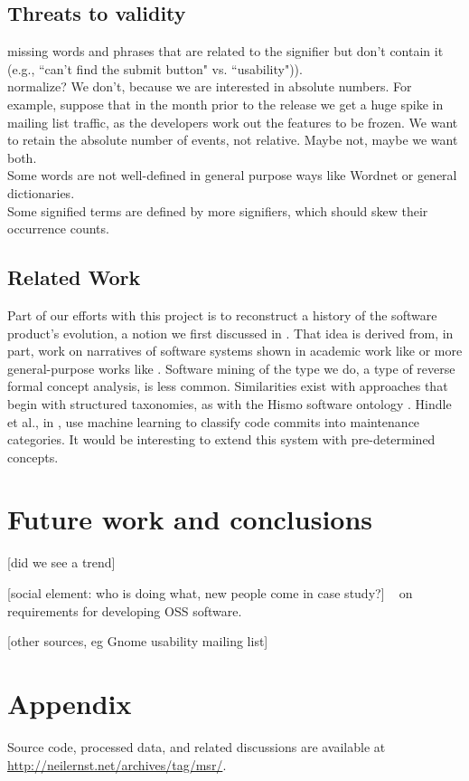 \documentclass[conference, compsoc]{IEEEtran}
\begin{document}
\subsection{Threats to validity}
missing words and phrases that are related to the signifier but don't contain it (e.g., ``can't find the submit button" vs. ``usability")). \\
normalize? We don't, because we are interested in absolute numbers. For example, suppose that in the month prior to the release we get a huge spike in mailing list traffic, as the developers work out the features to be frozen. We want to retain the absolute number of events, not relative. Maybe not, maybe we want both.\\
Some words are not well-defined in general purpose ways like Wordnet or general dictionaries.\\
Some signified terms are defined by more signifiers, which should skew their occurrence counts.\\
\subsection{Related Work}
Part of our efforts with this project is to reconstruct a history of the software product's evolution, a notion we first discussed in \cite{Ernst07icsm}. That idea is derived from, in part, work on narratives of software systems shown in academic work like \cite{Anton2001} or more general-purpose works like \cite{waldo93}. Software mining of the type we do, a type of reverse formal concept analysis, is less common. Similarities exist with approaches that begin with structured taxonomies, as with the Hismo software ontology \cite{Girba2006}. Hindle et al., in \cite{hindle09icpc}, use machine learning to classify code commits into maintenance categories. It would be interesting to extend this system with pre-determined concepts.

\section{Future work and conclusions}
[did we see a trend]

[social element: who is doing what, new people come in case study?] ~\cite{Scacchi2002} on requirements for developing OSS software.

[other sources, eg Gnome usability mailing list] %
\section{Appendix}
Source code, processed data, and related discussions are available at \url{http://neilernst.net/archives/tag/msr/}.
\begin{footnotesize}

\end{footnotesize}
\end{document}

